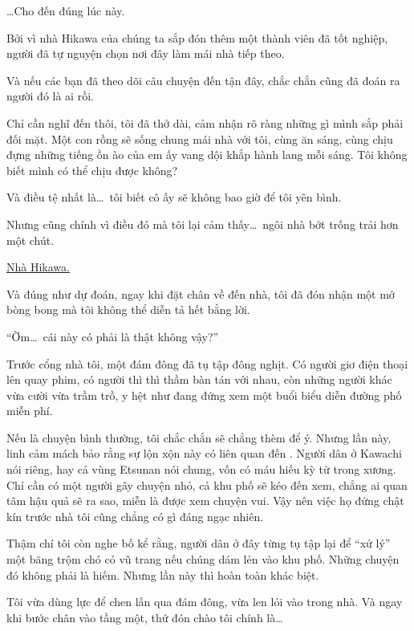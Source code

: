 \documentclass[../main.tex]{subfiles}
\begin{document}
\dots Cho đến đúng lúc này.

Bởi vì nhà Hikawa của chúng ta sắp đón thêm một thành viên đã tốt nghiệp, người đã tự nguyện chọn nơi đây làm mái nhà tiếp theo.

Và nếu các bạn đã theo dõi câu chuyện đến tận đây, chắc chắn cũng đã đoán ra người đó là ai rồi.

Chỉ cần nghĩ đến thôi, tôi đã thở dài, cảm nhận rõ ràng những gì mình sắp phải đối mặt. Một con rồng sẽ sống chung mái nhà với tôi, cùng ăn sáng, cùng chịu đựng những tiếng ồn ào của em ấy vang dội khắp hành lang mỗi sáng. Tôi không biết mình có thể chịu được không?

Và điều tệ nhất là\dots\ tôi biết cô ấy sẽ không bao giờ để tôi yên bình.

Nhưng cũng chính vì điều đó mà tôi lại cảm thấy\dots\ ngôi nhà bớt trống trải hơn một chút.

\begin{center}
  \uline{Nhà Hikawa.}
\end{center}


Và đúng như dự đoán, ngay khi đặt chân về đến nhà, tôi đã đón nhận một mớ bòng bong mà tôi không thể diễn tả hết bằng lời.

``Ờm\dots\ cái này có phải là thật không vậy?''

Trước cổng nhà tôi, một đám đông đã tụ tập đông nghịt. Có người giơ điện thoại lên quay phim, có người thì thì thầm bàn tán với nhau, còn những người khác vừa cười vừa trầm trồ, y hệt như đang đứng xem một buổi biểu diễn đường phố miễn phí.

Nếu là chuyện bình thường, tôi chắc chắn sẽ chẳng thèm để ý. Nhưng lần này, linh cảm mách bảo rằng sự lộn xộn này có liên quan đến \hll. Người dân ở Kawachi nói riêng, hay cả vùng Etsunan nói chung, vốn có máu hiếu kỳ từ trong xương. Chỉ cần có một người gây chuyện nhỏ, cả khu phố sẽ kéo đến xem, chẳng ai quan tâm hậu quả sẽ ra sao, miễn là được xem chuyện vui. Vậy nên việc họ đứng chật kín trước nhà tôi cũng chẳng có gì đáng ngạc nhiên.

Thậm chí tôi còn nghe bố kể rằng, người dân ở đây từng tụ tập lại để ``xử lý'' một băng trộm chó có vũ trang nếu chúng dám lẻn vào khu phố. Những chuyện đó không phải là hiếm. Nhưng lần này thì hoàn toàn khác biệt.

Tôi vừa dùng lực để chen lấn qua đám đông, vừa len lỏi vào trong nhà. Và ngay khi bước chân vào tầng một, thứ đón chào tôi chính là\dots
\end{document}
